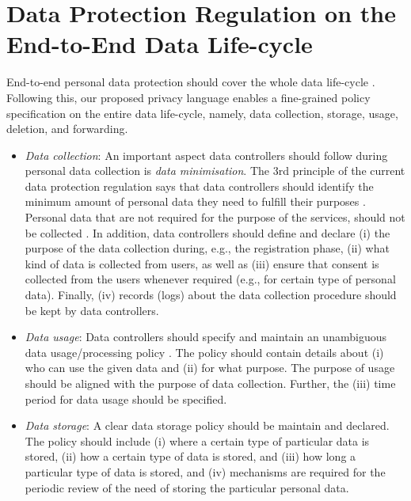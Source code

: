 \documentclass[a4paper]{article}
\begin{document}
\section{Data Protection Regulation on the End-to-End Data Life-cycle}
\label{sec:e2e}

End-to-end personal data protection should cover the whole data life-cycle \cite{ButinTN15}.  Following this, our proposed privacy language enables a fine-grained policy specification on the entire data life-cycle, namely, data collection, storage, usage, deletion, and forwarding. 




\begin{itemize}
\item \textit{Data collection}: An important aspect data controllers should follow during personal data collection is \textit{data minimisation}. The 3rd principle of the current data protection regulation says that data controllers should identify the minimum amount of personal data they need to fulfill their purposes \cite{ico1}. Personal data that are not required for the purpose of the services, should not be collected \cite{ButinTN15}. In addition, data controllers should define and declare (i) the purpose of the data collection during, e.g., the registration phase, (ii) what kind of data is collected from users, as well as (iii) ensure that consent is collected from the users whenever required (e.g., for certain type of personal data). Finally, (iv) records (logs) about the data collection procedure should be kept by data controllers.    

   



\item \textit{Data usage}: Data controllers should specify and maintain an unambiguous data usage/processing policy \cite{ButinTN15, EUuse}. The policy should contain details about (i) who can use the given data and (ii) for what purpose. The purpose of usage should be aligned with the purpose of data collection. Further, the (iii) time period for data usage should be specified.  




\item \textit{Data storage}: A clear data storage policy should be maintain and declared. The policy should include \cite{ButinTN15, d95, ico2} (i) where a certain type of particular data is stored, (ii) how a certain type of data is stored, and (iii) how long a particular type of data is stored, and (iv) mechanisms are required for the periodic review of the need of storing the particular personal data.    
   



\end{itemize}
\end{document}
